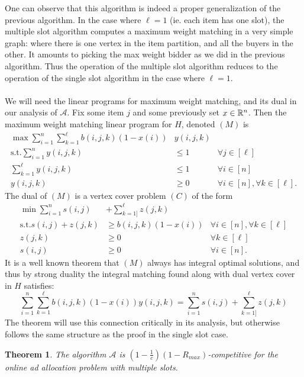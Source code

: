 \documentclass[letterpaper,12pt,oneside,onecolumn]{article}
\newcommand{\cA}{\mathcal{A}} \newcommand{\cB}{\mathcal{B}}
\newtheorem{theorem}[fact]{Theorem}
\begin{document}
One can observe that this algorithm is indeed a proper generalization of the previous algorithm. In the case where $\ell = 1$ (ie. each item has one slot), the multiple slot algorithm computes a maximum weight matching in a very simple graph: where there is one vertex in the item partition, and all the buyers in the other. It amounts to picking the max weight bidder as we did in the previous algorithm. Thus the operation of the multiple slot algorithm reduces to the operation of the single slot algorithm in the case where $\ell = 1$.
\paragraph{}
We will need the linear programs for maximum weight matching, and its dual in our analysis of $\cA$. Fix some item $j$ and some previously set $x \in \mathbb{R}^n$. Then the maximum weight matching linear program for $H$, denoted $(M)$ is
\begin{align*}
\max \sum_{i=1}^n \sum_{k=1}^\ell b(i,j,k)(1-x(i))&y(i,j,k) \\
\text{s.t.} \sum_{i=1}^ny(i,j,k) &\leq 1 &\forall j \in [\ell] \\
\sum_{k=1}^\ell y(i,j,k) &\leq 1 &\forall i \in [n] \\
y(i,j,k) &\geq 0 &\forall i \in [n], \forall k \in [\ell].
\end{align*}
The dual of $(M)$ is a vertex cover problem $(C)$ of the form
\begin{align*}
\min \sum_{i=1}^n s(i,j) &+ \sum_{k=1]}^\ell z(j,k) \\
\text{s.t.} s(i,j) + z(j,k) &\geq b(i,j,k)(1-x(i)) &\forall i \in [n], \forall k \in [\ell] \\
z(j,k) &\geq 0 &\forall k \in [\ell] \\
s(i,j) &\geq 0 &\forall i \in [n].
\end{align*}
It is a well known theorem that $(M)$ always has integral optimal solutions, and thus by strong duality the integral matching found along with dual vertex cover in $H$  satisfies:
\begin{equation}\label{eq:sd}
\sum_{i=1}^n \sum_{k=1}^\ell b(i,j,k)(1-x(i))y(i,j,k) = \sum_{i=1}^n s(i,j) + \sum_{k=1]}^\ell z(j,k)
\end{equation}
The theorem will use this connection critically in its analysis, but otherwise follows the same structure as the proof in the single slot case.
\begin{theorem}
The algorithm $\cA$ is $(1-\frac{1}{c})(1-R_{max})$-competitive for the online ad allocation problem with multiple slots.
\end{theorem}
\end{document}
